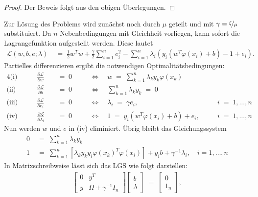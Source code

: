 \begin{proof}
	Der Beweis folgt aus den obigen Überlegungen.
\end{proof}
Zur Lösung des Problems wird zunächst noch durch \(\mu\) geteilt und mit \(\gamma=\nicefrac{\xi}{\mu}\) substituiert. Da \(n\) Nebenbedingungen mit Gleichheit vorliegen, kann sofort die Lagrangefunktion aufgestellt werden. Diese lautet
\begin{align*}
	\mathcal{L}(w,b,e;\lambda)&\;=\;\frac{1}{2}w^Tw+\frac{\gamma}{2}\sum_{i=1}^{n}e_i^2-\sum_{i=1}^{n}\lambda_i\left(y_i\left(w^T\varphi(x_i)+b\right)-1+e_i\right).
\end{align*}
Partielles differenzieren ergibt die notwendigen  Optimalitätsbedingungen:
\begin{alignat*}{4}
	\text{(i)}&\qquad \frac{\partial \mathcal{L}}{\partial w} &&\;=\;0 && \quad\Leftrightarrow\quad w\;=\;\sum_{k=1}^{n}\lambda_ky_k\varphi(x_k) && \\[0,3cm]
	\text{(ii)}&\qquad \frac{\partial \mathcal{L}}{\partial b} &&\;=\;0 && \quad\Leftrightarrow\quad \sum_{k=1}^{n}\lambda_ky_k\;=\;0 && \\[0,3cm]
	\text{(iii)}&\qquad \frac{\partial \mathcal{L}}{\partial e_i} &&\;=\;0 && \quad\Leftrightarrow\quad \lambda_i\;=\;\gamma e_i, && i\;=\;1,\dots,n\\[0,3cm]
	\text{(iv)}&\qquad \frac{\partial \mathcal{L}}{\partial \lambda_i} &&\;=\;0 && \quad\Leftrightarrow\quad 1\;=\;y_i\left(w^T\varphi(x_i)+b\right)+e_i,\quad && i\;=\;1,\dots,n
\end{alignat*}
Nun werden \(w\) und \(e\) in (iv) eliminiert. Übrig bleibt das Gleichungssystem
\begin{align*}
	0&\;=\;\sum_{k=1}^{n}\lambda_ky_k\\
	1&\;=\;\sum_{k=1}^{n}\left[\lambda_ky_ky_i\varphi(x_k)^T\varphi(x_i)\right]+y_ib+\gamma^{-1}\lambda_i,\quad i=1,\dots,n
\end{align*}
In Matrixschreibweise lässt sich das LGS wie folgt darstellen:
\begin{align*}
	\begin{bmatrix}
		0& y^T \\[0,5cm]
		y& \Omega+\gamma^{-1}I_n
	\end{bmatrix}
	\begin{bmatrix}
		b \\[0,2cm]
		\lambda
	\end{bmatrix}\;=\;
	\begin{bmatrix}
		0 \\[0,2cm] 
		1_n
	\end{bmatrix},
\end{align*}
